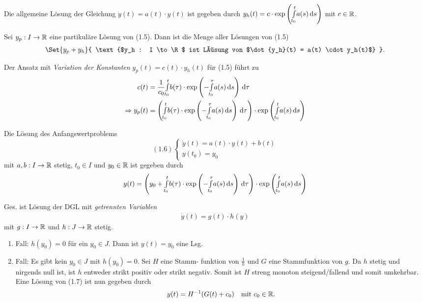 \documentclass{cheat-sheet}
\begin{document}
\begin{satz}
  Die allgemeine Lösung der Gleichung $\dot{y}(t) = a(t) \cdot y(t)$ ist gegeben durch $y_h(t) = c \cdot \exp\left({\textstyle \int\limits_{t_0}^{t}} a(s) \,\mathrm{d} s\right)$ mit $c \in \mathbb{R}$.
\end{satz}

\begin{satz}[Superpositionsprinzip]
  Sei $y_p : I \to \mathbb{R}$ eine partikuläre Lösung von (1.5). Dann ist die Menge aller Lösungen von (1.5)
  \[ \Set{ y_p + y_h }{ \text{$y_h : I \to \R$ ist Lösung von $\dot{y_h}(t) = a(t) \cdot y_h(t)$} }. \]
\end{satz}

\begin{bem}
  Der Ansatz mit \emph{Variation der Konstanten} $y_p(t) = c(t) \cdot y_h(t)$ für (1.5) führt zu
  \begin{align*}
    c(t) &= \frac{1}{c_0} {\textstyle \int\limits_{t_0}^{t}} b(\tau) \cdot \exp\left( - {\textstyle \int\limits_{t_0}^{\tau}} a(s) \,\mathrm{d} s \right) \,\mathrm{d} \tau\\
    \Rightarrow y_p(t) &= \left( {\textstyle \int\limits_{t_0}^{t}} b(\tau) \cdot \exp\left( - {\textstyle \int\limits_{t_0}^{\tau}} a(s) \,\mathrm{d} s \right) \,\mathrm{d} \tau \right) \cdot \exp\left( {\textstyle \int\limits_{t_0}^{t}} a(s) \,\mathrm{d} s \right)
  \end{align*}
\end{bem}

\begin{kor}
  Die Lösung des Anfangswertproblems
  \[
    (1.6) \left\{ \begin{array}{l}
      \dot{y}(t) = a(t) \cdot y(t) + b(t)\\
      y(t_0) = y_0
    \end{array} \right.
  \]
  mit $a, b : I \to \mathbb{R}$ stetig, $t_0 \in I$ und $y_0 \in \mathbb{R}$ ist gegeben durch
  \[ y(t) = \left( y_0 + {\textstyle \int\limits_{t_0}^{t}} b(\tau) \cdot \exp\left( - {\textstyle \int\limits_{t_0}^{\tau}} a(s) \,\mathrm{d} s \right) \,\mathrm{d} \tau \right) \cdot \exp\left( {\textstyle \int\limits_{t_0}^{t}} a(s) \,\mathrm{d} s \right) \]
\end{kor}

\begin{prob}
  Ges. ist Lösung der DGL mit \emph{getrennten Variablen}
  \begin{align}
    \dot{y}(t) = g(t) \cdot h(y) \tag{1.7}
  \end{align}
  mit $g : I \to \mathbb{R}$ und $h : J \to \mathbb{R}$ stetig.
\end{prob}

\begin{lsg}
  \begin{enumerate}
    \item Fall: $h(y_0) = 0$ für ein $y_0 \in J$. Dann ist $y(t) = y_0$ eine Lsg.
    \item Fall: Es gibt kein $y_0 \in J$ mit $h(y_0) = 0$. Sei $H$ eine Stamm- funktion von $\tfrac{1}{h}$ und $G$ eine Stammfunktion von $g$. Da $h$ stetig und nirgends null ist, ist $h$ entweder strikt positiv oder strikt negativ. Somit ist $H$ streng monoton steigend/fallend und somit umkehrbar. Eine Lösung von (1.7) ist nun gegeben durch
    \[ y(t) = H^{-1}(G(t) + c_0) \quad \text{mit $c_0 \in \mathbb{R}$.} \]
  \end{enumerate}
\end{lsg}
\end{document}

